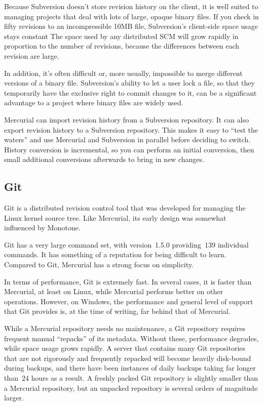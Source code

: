 Because Subversion doesn't store revision history on the client, it is
well suited to managing projects that deal with lots of large, opaque
binary files.  If you check in fifty revisions to an incompressible
10MB file, Subversion's client-side space usage stays constant The
space used by any distributed SCM will grow rapidly in proportion to
the number of revisions, because the differences between each revision
are large.

In addition, it's often difficult or, more usually, impossible to
merge different versions of a binary file.  Subversion's ability to
let a user lock a file, so that they temporarily have the exclusive
right to commit changes to it, can be a significant advantage to a
project where binary files are widely used.

Mercurial can import revision history from a Subversion repository.
It can also export revision history to a Subversion repository.  This
makes it easy to ``test the waters'' and use Mercurial and Subversion
in parallel before deciding to switch.  History conversion is
incremental, so you can perform an initial conversion, then small
additional conversions afterwards to bring in new changes.


\subsection{Git}

Git is a distributed revision control tool that was developed for
managing the Linux kernel source tree.  Like Mercurial, its early
design was somewhat influenced by Monotone.

Git has a very large command set, with version~1.5.0 providing~139
individual commands.  It has something of a reputation for being
difficult to learn.  Compared to Git, Mercurial has a strong focus on
simplicity.

In terms of performance, Git is extremely fast.  In several cases, it
is faster than Mercurial, at least on Linux, while Mercurial performs
better on other operations.  However, on Windows, the performance and
general level of support that Git provides is, at the time of writing,
far behind that of Mercurial.

While a Mercurial repository needs no maintenance, a Git repository
requires frequent manual ``repacks'' of its metadata.  Without these,
performance degrades, while space usage grows rapidly.  A server that
contains many Git repositories that are not rigorously and frequently
repacked will become heavily disk-bound during backups, and there have
been instances of daily backups taking far longer than~24 hours as a
result.  A freshly packed Git repository is slightly smaller than a
Mercurial repository, but an unpacked repository is several orders of
magnitude larger.

